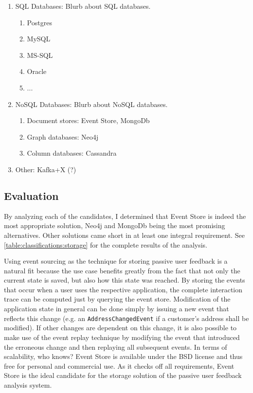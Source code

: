 \begin{enumerate}
\item \ac{SQL} Databases: Blurb about SQL databases.
\begin{enumerate}
\item Postgres
\item MySQL
\item MS-SQL
\item Oracle
\item ...
\end{enumerate}
\item NoSQL Databases: Blurb about NoSQL databases.\cite{strauch2011nosql}
\begin{enumerate}
\item Document stores: Event Store, MongoDb
\item Graph databases: Neo4j
\item Column databases: Cassandra
\end{enumerate}
\item Other: Kafka+X (?)
\end{enumerate}

\subsection{Evaluation}

By analyzing each of the candidates, I determined that Event Store is indeed the most appropriate solution, Neo4j and MongoDb being the most promising alternatives.
Other solutions came short in at least one integral requirement.
See \cref{table:classifications:storage} for the complete results of the analysis.

Using event sourcing as the technique for storing passive user feedback is a natural fit because the use case benefits greatly from the fact that not only the current state is saved, but also how this state was reached.
By storing the events that occur when a user uses the respective application, the complete interaction trace can be computed just by querying the event store.
Modification of the application state in general can be done simply by issuing a new event that reflects this change (e.g. an \texttt{AddressChangedEvent} if a customer's address shall be modified).
If other changes are dependent on this change, it is also possible to make use of the event replay technique by modifying the event that introduced the erroneous change and then replaying all subsequent events.
In terms of scalability, who knows? 
Event Store is available under the BSD license and thus free for personal and commercial use.
As it checks off all requirements, Event Store is the ideal candidate for the storage solution of the passive user feedback analysis system.

